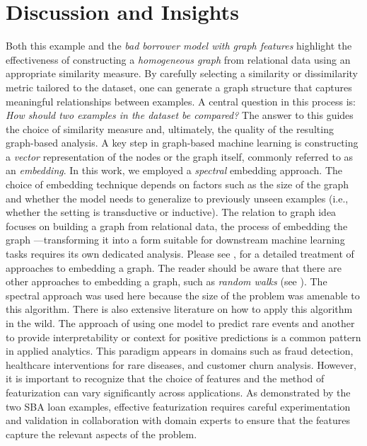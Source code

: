 \documentclass[12pt]{article}
\begin{document}
\section{Discussion and Insights}
Both this example and the \emph{bad borrower model with graph features} highlight the effectiveness of constructing a \emph{homogeneous graph} from relational data using an appropriate similarity measure. By carefully selecting a similarity or dissimilarity metric tailored to the dataset, one can generate a graph structure that captures meaningful relationships between examples. A central question in this process is: \emph{How should two examples in the dataset be compared?} The answer to this guides the choice of similarity measure and, ultimately, the quality of the resulting graph-based analysis.
A key step in graph-based machine learning is constructing a \emph{vector} representation of the nodes or the graph itself, commonly referred to as an \emph{embedding}. In this work, we employed a \emph{spectral} embedding approach. The choice of embedding technique depends on factors such as the size of the graph and whether the model needs to generalize to previously unseen examples (i.e., whether the setting is transductive or inductive). The relation to graph idea focuses on building a graph from relational data, the process of embedding the graph —transforming it into a form suitable for downstream machine learning tasks requires its own dedicated analysis. Please see \cite{chami_etal}, \cite{hamilton2020graph} for a detailed treatment of approaches to embedding a graph. The reader should be aware that there are other approaches to embedding a graph, such as \emph{random walks} (see \cite{leskovic_jure_cs_224_rw_lecture}). The spectral approach was used here because the size of the problem was amenable to this algorithm. There is also extensive literature on how to apply this algorithm in the wild.
The approach of using one model to predict rare events and another to provide interpretability or context for positive predictions is a common pattern in applied analytics. This paradigm appears in domains such as fraud detection, healthcare interventions for rare diseases, and customer churn analysis. However, it is important to recognize that the choice of features and the method of featurization can vary significantly across applications. As demonstrated by the two SBA loan examples, effective featurization requires careful experimentation and validation in collaboration with domain experts to ensure that the features capture the relevant aspects of the problem.
\printbibliography
\end{document}
